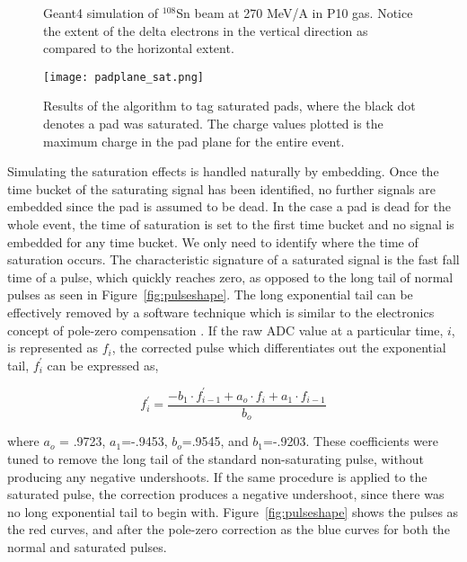 

\begin{figure}[!htb]%
    \centering
    \qquad

  	 \caption{Geant4 simulation of ${}^{108}$Sn beam at 270 MeV/A in P10 gas. Notice the extent of the delta electrons in the vertical direction as compared to the horizontal extent. }
	\label{fig:deltaE}
\end{figure}


\begin{figure}[!htb]
\texttt{[image: padplane\_sat.png]}
\caption{Results of the algorithm to tag saturated pads, where the black dot denotes a pad was saturated. The charge values plotted is the maximum charge in the pad plane for the entire event.}
\label{fig:satTag}
\end{figure}

Simulating the saturation effects is handled naturally by embedding. Once the time bucket of the saturating signal has been identified, no further signals are embedded since the pad is assumed to be dead. In the case a pad is dead for the whole event, the time of saturation is set to the first time bucket and no signal is embedded for any time bucket. We only need to identify where the time of saturation occurs. The characteristic signature of a saturated signal is the fast fall time of a pulse, which quickly reaches zero, as opposed to the long tail of normal pulses as seen in Figure~\ref{fig:pulseshape}. The long exponential tail can be effectively removed by a software technique which is similar to the electronics concept of pole-zero compensation \cite{polezero}. If the raw ADC value at a particular time, $i$, is represented as $f_i$, the corrected pulse which differentiates out the exponential tail, $f_i^{'}$ can be expressed as, 

\begin{equation}
f_i^{'} = \frac{-b_1\cdot f_{i-1}^{'} + a_o\cdot f_i + a_1 \cdot f_{i-1}}{b_o}
\label{eq:satpolez}
\end{equation}

where $a_o$ = .9723, $a_1$=-.9453, $b_o$=.9545, and $b_1$=-.9203. These coefficients were tuned to remove the long tail of the standard non-saturating pulse, without producing any negative undershoots. If the same procedure is applied to the saturated pulse, the correction produces a negative undershoot, since there was no long exponential tail to begin with. Figure~\ref{fig:pulseshape} shows the pulses as the red curves, and after the pole-zero correction as the blue curves for both the normal and saturated pulses. 

